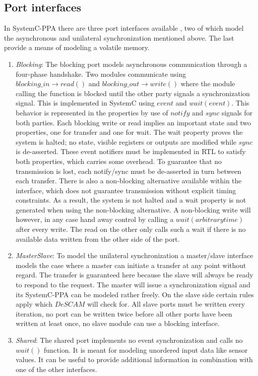 \subsection{Port interfaces}
\label{sub:ports}       
In SystemC-PPA there are three port interfaces available \cite{descam}, two of which model the asynchronous and unilateral synchronization mentioned above. The last provide a means of modeling a volatile memory. 

\begin{enumerate}
 \item \textit{Blocking}: The blocking port models asynchronous communication through a four-phase handshake. 
 Two modules communicate using $blocking\_in\rightarrow read()$ and $blocking\_out\rightarrow write()$ where the module calling the function is blocked until the other party signals a synchronization signal. 
 This is implemented in SystemC using $event$ and $wait(event)$. This behavior is represented in the properties by use of $notify$ and $sync$ signals for both parties. 
 Each blocking write or read implies an important state and two properties, one for transfer and one for wait. The wait property proves the system is halted; no state, 
 visible registers or outputs are modified while $sync$ is de-asserted. These event notifiers must be implemented in RTL to satisfy both properties, which carries some overhead. 
 To guarantee that no transmission is lost, each notify/sync must be de-asserted in turn between each transfer. There is also a non-blocking alternative available within the interface, 
 which does not guarantee transmission without explicit timing constraints. As a result, the system is not halted and a wait property is not generated when using the non-blocking alternative.
  A non-blocking write will however, in any case hand away control by calling a $wait(arbitrary time)$ after every write. The read on the other only calls such a wait if there is no available data written from the other side of the port.  
 \item \textit{MasterSlave}: To model the unilateral synchronization a master/slave interface models the case where a master can initiate a transfer at any point without regard. The transfer is guaranteed here because the slave will always be ready to respond to the request. The master will issue a synchronization signal and its SystemC-PPA can be modeled rather freely. On the slave side certain rules apply which $DeSCAM$ will check for. All slave ports must be written every iteration, no port can be written twice before all other ports have been written at least once, no slave module can use a blocking interface.
 \item \textit{Shared}: The shared port implements no event synchronization and calls no $wait()$ function. It is meant for modeling unordered input data like sensor values. It can be useful to provide additional information in combination with one of the other interfaces.   
\end{enumerate} 

